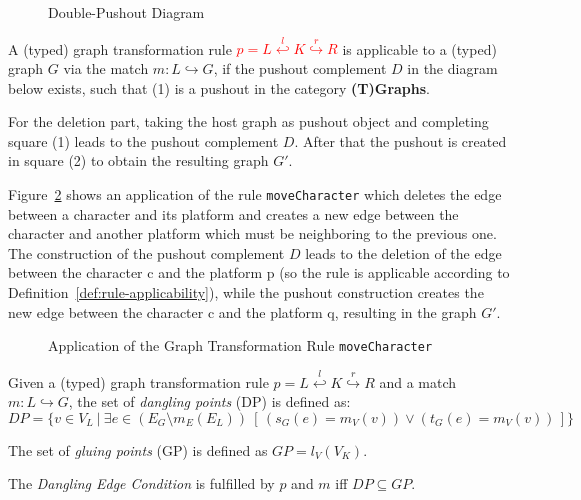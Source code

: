 \begin{figure}[h!]
	\centering
	
	\caption{Double-Pushout Diagram}
	\label{fig:double-pushout}
\end{figure}

\begin{definition}
	\label{def:rule-applicability}%
	A (typed) graph transformation rule \textcolor{red}{$p = L \stackrel{l}{\hookleftarrow} K \stackrel{r}{\hookrightarrow} R$} is applicable to a (typed) graph $G$ via the  match $m: L \hookrightarrow G$,  if the pushout complement $D$ in the diagram below exists, such that (1) is a pushout in the category \textbf{(T)Graphs}.  
\end{definition}

\noindent
For the deletion part, taking the host graph as pushout object and completing square (1) leads to the pushout complement $D$.
After that the pushout is created in square (2) to obtain the resulting graph $G'$.

Figure~\ref{fig:example-dpo-rule-application} shows an application of the rule \texttt{moveCharacter} which deletes the edge between a character and its platform and creates a new edge between the character and another platform which must be neighboring to the previous one.
The construction of the pushout complement $D$ leads to the deletion of the edge between the character c and the platform p (so the rule is applicable according to Definition~\ref{def:rule-applicability}), while the pushout construction creates the new edge between the character c and the platform q, resulting in the graph $G'$.

\begin{figure}[h!]
	\centering
	
	\caption{Application of the Graph Transformation Rule \texttt{moveCharacter}}
	\label{fig:example-dpo-rule-application}
\end{figure}

\begin{definition}
	\label{def:dangling-edge-condition}%
	Given a (typed) graph transformation rule $p = L \stackrel{l}{\hookleftarrow} K \stackrel{r}{\hookrightarrow} R$ and a match $m: L \hookrightarrow G$, the set of \emph{dangling points} (DP) is defined as:
	\[
		DP = \{ v \in V_L ~|~ \exists e \in (E_G \setminus m_E(E_L))~[\,(s_G(e) = m_V(v)) \vee (t_G(e) = m_V(v))\,] \}
	\]

	\gap
	The set of \emph{gluing points} (GP) is defined as $GP = l_V(V_K)$.

	\gap
	The \emph{Dangling Edge Condition} is fulfilled by $p$ and $m$ iff $DP \subseteq GP$.   
\end{definition}

